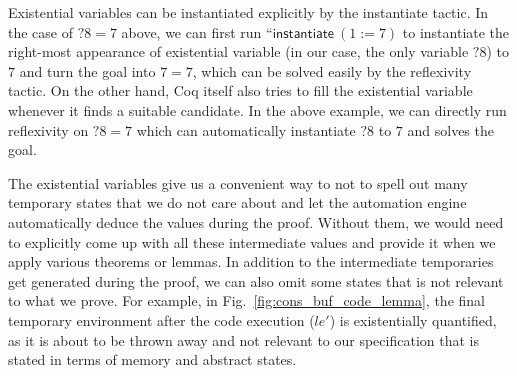 Existential variables can be instantiated explicitly by the \textsf{instantiate}
tactic. In the case of $?8=7$ above, we can first run
``$\textsf{instantiate}~(1:=7)$ to instantiate the right-most appearance of
existential variable (in our case, the only variable $?8$) to $7$ and turn
the goal into $7=7$, which can be solved easily by the \textsf{reflexivity} tactic.
On the other hand, Coq itself also tries to fill the existential variable
whenever it finds a suitable candidate. In the above example, we can directly
run \textsf{reflexivity} on $?8=7$ which can automatically instantiate
$?8$ to $7$ and solves the goal.

The existential variables give us a convenient way to not to spell out many
temporary states that we do not care about and let the automation engine
automatically deduce the values during the proof. Without them, we would need
to explicitly come up with all these intermediate values and provide it when
we apply various theorems or lemmas. In addition to the intermediate temporaries
get generated during the proof, we can also omit some states that is not
relevant to what we prove. For example, in Fig.~\ref{fig:cons_buf_code_lemma},
the final temporary environment after the code execution ($le'$) is existentially
quantified, as it is about to be thrown away and not relevant to our specification
that is stated in terms of memory and abstract states.

